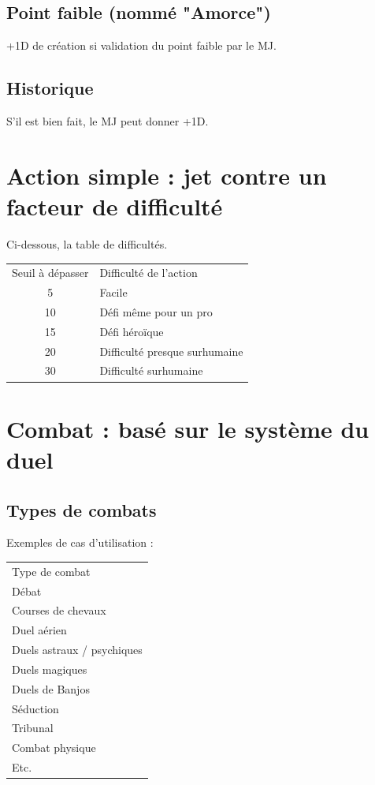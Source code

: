 \documentclass[a4paper, 11pt, twocolumn, twoside]{article}
\begin{document}
\subsection{Point faible (nommé "Amorce")}
\label{sec:org5294fd2}

+1D de création si validation du point faible par le MJ.

\subsection{Historique}
\label{sec:org637614c}

S'il est bien fait, le MJ peut donner +1D.

\section{Action simple : jet contre un facteur de difficulté}
\label{sec:org942ac81}

Ci-dessous, la table de difficultés.

\begin{longtable}{cl}
Seuil à dépasser & Difficulté de l'action\\
5 & Facile\\
10 & Défi même pour un pro\\
15 & Défi héroïque\\
20 & Difficulté presque surhumaine\\
30 & Difficulté surhumaine\\
\end{longtable}


\section{Combat : basé sur le système du duel}
\label{sec:org1474ce0}

\subsection{Types de combats}
\label{sec:org4062b1c}

Exemples de cas d'utilisation :

\begin{longtable}{l}
Type de combat\\
Débat\\
Courses de chevaux\\
Duel aérien\\
Duels astraux / psychiques\\
Duels magiques\\
Duels de Banjos\\
Séduction\\
Tribunal\\
Combat physique\\
Etc.\\
\end{longtable}
\end{document}
